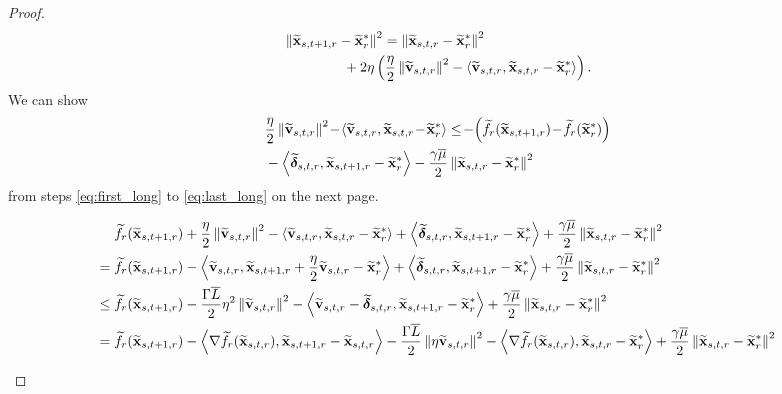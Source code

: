 \documentclass[10pt,twocolumn,journal]{IEEEtran}
\begin{document}
\begin{proof}
\begin{align}
&\norm{\tilbx_{s,t+1,r}-\tilbx_r^*}^2%
= \norm{\tilbx_{s,t,r} - \tilbx_r^*}^2 \nn\\
&\hspace{1.5cm}+ 2\eta\left(\frac{\eta}{2}\norm{\tilbv_{s,t,r}}^2 - \lrangle{\tilbv_{s,t,r}}{\tilbx_{s,t,r} - \tilbx_r^*}\right). \label{eq:expanded_dist}
\end{align}
We can show %
\begin{align}
&\frac{\eta}{2}\norm{\tilbv_{s,t,r}}^2 \!-\! \lrangle{\tilbv_{s,t,r}}{\tilbx_{s,t,r} \!-\! \tilbx_r^*}\le \!-\!\left(\tilf_r (\tilbx_{s,t+1,r})\!-\!\tilf_r (\tilbx_{r}^*)\right)\nn\\
&-\lrangle{\tbdelta_{s,t,r}}{\tilbx_{s,t+1,r}-\tilbx_r^*} - \frac{\gamma\barmu}{2}\norm{\tilbx_{s,t,r}-\tilbx_r^*}^2 \label{eq:bound_expanded}
\end{align}
from steps \eqref{eq:first_long} to \eqref{eq:last_long} on the next page. %
\begin{figure*}[h!]
\begin{align} 
&\tilf_r (\tilbx_{s,t+1,r})+\frac{\eta}{2}\norm{\tilbv_{s,t,r}}^2 - \lrangle{\tilbv_{s,t,r}}{\tilbx_{s,t,r} - \tilbx_r^*}+\lrangle{\tbdelta_{s,t,r}}{\tilbx_{s,t+1,r}-\tilbx_r^*} +\frac{\gamma\barmu}{2}\norm{\tilbx_{s,t,r}-\tilbx_r^*}^2\label{eq:first_long}\\ %
=\;& \tilf_r (\tilbx_{s,t+1,r}) - \lrangle{\tilbv_{s,t,r}}{\tilbx_{s,t+1,r} +\frac{\eta}{2}\tilbv_{s,t,r}-\tilbx_r^*}+\lrangle{\tbdelta_{s,t,r}}{\tilbx_{s,t+1,r}-\tilbx_r^*} +\frac{\gamma\barmu}{2}\norm{\tilbx_{s,t,r}-\tilbx_r^*}^2\\%
\le\;& \tilf_r (\tilbx_{s,t+1,r}) - \frac{\Gamma\barL}{2}\eta^2\norm{\tilbv_{s,t,r}}^2- \lrangle{\tilbv_{s,t,r}-\tbdelta_{s,t,r}}{\tilbx_{s,t+1,r} -\tilbx_r^*}+\frac{\gamma\barmu}{2}\norm{\tilbx_{s,t,r}-\tilbx_r^*}^2\label{eq:lea}\\%
=\;& \tilf_r (\tilbx_{s,t+1,r}) - \lrangle{\nabla \tilf_r (\tilbx_{s,t,r})}{\tilbx_{s,t+1,r} -\tilbx_{s,t,r}}- \frac{\Gamma\barL}{2}\norm{\eta\tilbv_{s,t,r}}^2-\lrangle{\nabla \tilf_r (\tilbx_{s,t,r})}{\tilbx_{s,t,r}-\tilbx_r^*}+\frac{\gamma\barmu}{2}\norm{\tilbx_{s,t,r}-\tilbx_r^*}^2\\

\end{align}
\end{figure*}
\end{proof}
\end{document}
